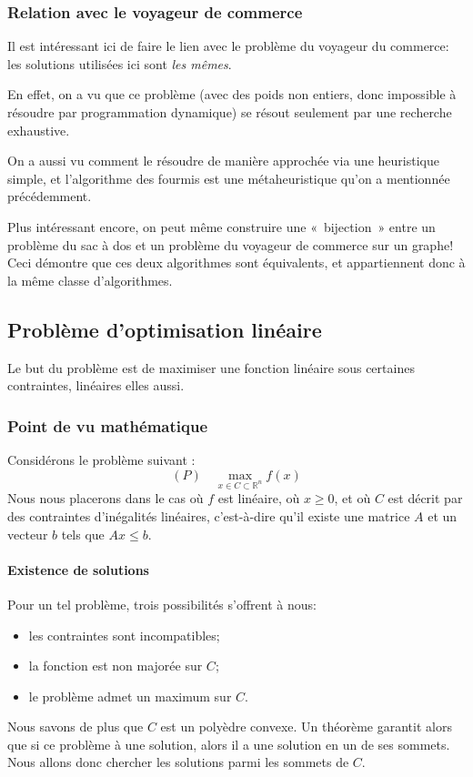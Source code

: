   \subsubsection{Relation avec le voyageur de commerce}
    Il est intéressant ici de faire le lien avec le problème du voyageur
    du commerce: les solutions utilisées ici sont \emph{les mêmes}.

    En effet, on a vu que ce problème (avec des poids non entiers, donc impossible
    à résoudre par programmation dynamique) se résout seulement par une recherche
    exhaustive.
    
    On a aussi vu comment le résoudre de manière approchée via une heuristique
    simple, et l'algorithme des fourmis est une métaheuristique qu'on a mentionnée
    précédemment.


    Plus intéressant encore, on peut même construire une «~bijection~» entre un
    problème du sac à dos
    et un problème du voyageur de commerce sur un graphe! \cite{knapsack_to_tsp}
    Ceci démontre que ces deux algorithmes sont équivalents, et appartiennent donc à la même
    classe d'algorithmes. %

\subsection{Problème d'optimisation linéaire}
  Le but du problème est de maximiser une fonction linéaire sous certaines
  contraintes, linéaires elles aussi.

  \subsubsection{Point de vu mathématique}
      Considérons le problème suivant :
      $$ (P) \quad \max_{x\in C \subset \mathbb{R}^n} f(x)$$
      Nous nous placerons dans le cas où $f$ est linéaire, où $x \geqslant 0$,
      et où $C$ est décrit par des contraintes d'inégalités linéaires,
      c'est-à-dire qu'il existe une matrice $A$ et un vecteur $b$ tels
      que $Ax\leqslant b$.

    \paragraph{Existence de solutions}
      Pour un tel problème, trois possibilités s'offrent à nous:
      \begin{itemize}
        \item les contraintes sont incompatibles;
        \item la fonction est non majorée sur $C$;
        \item le problème admet un maximum sur $C$.
      \end{itemize}
      Nous savons de plus que $C$ est un polyèdre convexe. Un théorème garantit
      alors que si ce problème à une solution, alors il a une solution en un de
      ses sommets. Nous allons donc chercher les solutions parmi les sommets de
      $C$.


